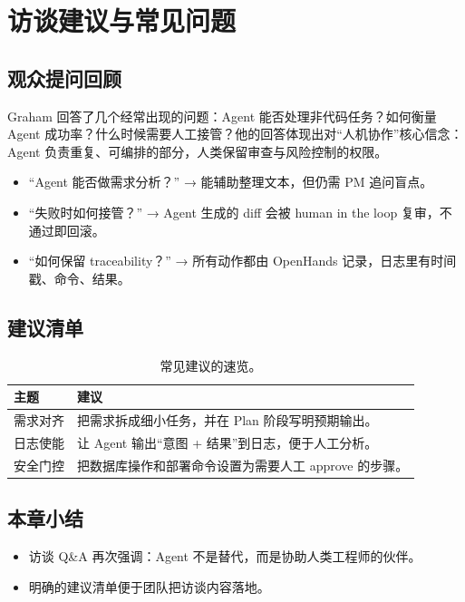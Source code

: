\section{访谈建议与常见问题}
\subsection{观众提问回顾}
Graham 回答了几个经常出现的问题：Agent 能否处理非代码任务？如何衡量 Agent 成功率？什么时候需要人工接管？他的回答体现出对“人机协作”核心信念：Agent 负责重复、可编排的部分，人类保留审查与风险控制的权限。

\begin{itemize}
    \item “Agent 能否做需求分析？” → 能辅助整理文本，但仍需 PM 追问盲点。
    \item “失败时如何接管？” → Agent 生成的 diff 会被 human in the loop 复审，不通过即回滚。
    \item “如何保留 traceability？” → 所有动作都由 OpenHands 记录，日志里有时间戳、命令、结果。
\end{itemize}

\subsection{建议清单}
\begin{table}[H]
\centering
\begin{tabular}{p{} p{}}
\toprule
主题 & 建议 \\
\midrule
需求对齐 & 把需求拆成细小任务，并在 Plan 阶段写明预期输出。 \\
\midrule
日志使能 & 让 Agent 输出“意图 + 结果”到日志，便于人工分析。 \\
\midrule
安全门控 & 把数据库操作和部署命令设置为需要人工 approve 的步骤。 \\
\bottomrule
\end{tabular}
\caption{常见建议的速览。}
\end{table}

\subsection{本章小结}
\begin{itemize}
    \item 访谈 Q\&A 再次强调：Agent 不是替代，而是协助人类工程师的伙伴。
    \item 明确的建议清单便于团队把访谈内容落地。
\end{itemize}

